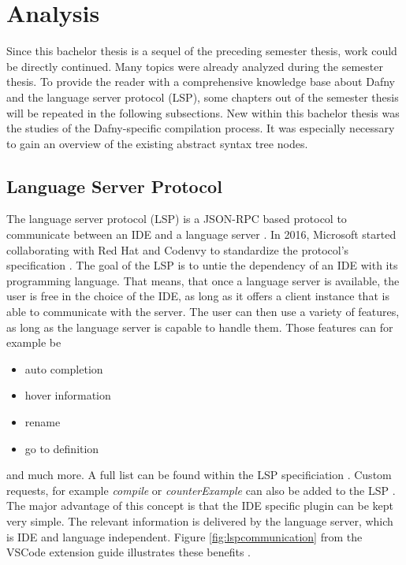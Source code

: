 \section{Analysis}


\label{section:analysis}
Since this bachelor thesis is a sequel of the preceding semester thesis, work could be directly continued.
Many topics were already analyzed during the semester thesis.
To provide the reader with a comprehensive knowledge base about Dafny and the language server protocol (LSP), some chapters out of the semester thesis will be repeated in the following subsections.
New within this bachelor thesis was the studies of the Dafny-specific compilation process.
It was especially necessary to gain an overview of the existing abstract syntax tree nodes.

\subsection{Language Server Protocol}
\label{section:analysis:lsp}
The language server protocol (LSP) is a JSON-RPC based protocol to communicate between an IDE and a language server \cite{lspWiki}.
In 2016, Microsoft started collaborating with Red Hat and Codenvy to standardize the protocol’s specification \cite{lspWiki}.
The goal of the LSP is to untie the dependency of an IDE with its programming language.
That means, that once a language server is available, the user is free in the choice of the IDE, as long as it offers a client instance that is able to communicate with the server.
The user can then use a variety of features, as long as the language server is capable to handle them.
Those features can for example be
\begin{itemize}
    \item auto completion
    \item hover information
    \item rename
    \item go to definition
\end{itemize}
and much more. A full list can be found within the LSP specificiation \cite{lspspec}.
Custom requests, for example \textit{compile} or \textit{counterExample} can also be added to the LSP \cite{lspWiki}.
The major advantage of this concept is that the IDE specific plugin can be kept very simple.
The relevant information is delivered by the language server, which is IDE and language independent.
Figure \ref{fig:lspcommunication} from the VSCode extension guide illustrates these benefits \cite{lspextensionguide}.

